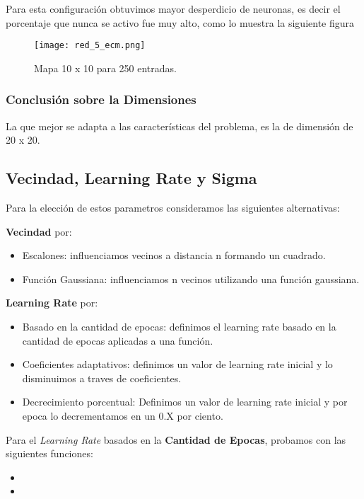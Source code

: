 Para esta configuración obtuvimos mayor desperdicio de neuronas,
es decir el porcentaje que nunca se activo fue muy alto, como lo muestra
la siguiente figura

\begin{figure}[H]
  \centering
  \texttt{[image: red\_5\_ecm.png]}
  \caption{Mapa 10 x 10 para 250 entradas.}
  \label{fig:mapa 10 10 250}
\end{figure}


\subsubsection{Conclusión sobre la Dimensiones}


La que mejor se adapta a las características del problema, es la
de dimensión de 20 x 20.


\subsection{Vecindad, Learning Rate y Sigma}

Para la elección de estos parametros consideramos las siguientes
alternativas:

\textbf{Vecindad} por:

\begin{itemize}
	\item Escalones: influenciamos vecinos a distancia n formando
un cuadrado.
	\item Función Gaussiana: influenciamos n vecinos utilizando
una función gaussiana.
\end{itemize}


\textbf{Learning Rate} por:

\begin{itemize}
	\item Basado en la cantidad de epocas: definimos el learning
rate basado en la cantidad de epocas aplicadas a una función.
	\item Coeficientes adaptativos: definimos un valor de
learning rate inicial y lo disminuimos a traves de coeficientes.
	\item Decrecimiento porcentual: Definimos un valor de 
learning rate inicial y por epoca lo decrementamos en un 0.X por ciento.
\end{itemize}

Para el \emph{Learning Rate} basados en la \textbf{Cantidad de Epocas}, probamos con 
las siguientes funciones:

\begin{itemize}
	\item {}
	\item {}
\end{itemize}

